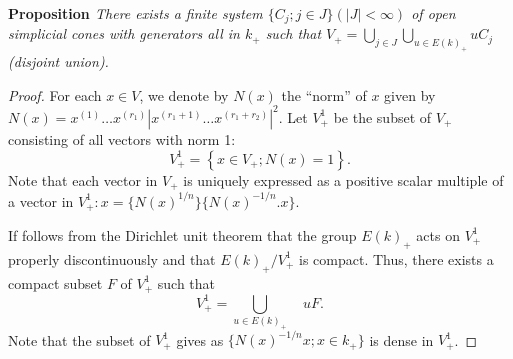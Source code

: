 \medskip
\noindent
{\bfseries Proposition \label{art8-prop2}} 
\textit{There exists a finite system $\{C_j; j \in J\} (|J| < \infty)$ of open simplicial cones with generators all in $k_+$ such that $V_+ = \bigcup\limits_{j \in J} \bigcup\limits_{u \in E (k)_+} uC_j$ (disjoint union).}

\begin{proof}
For each $x \in V$, we denote by $N(x)$ the ``norm'' of $x$ given by $N(x) = x^{(1)} \ldots x^{(r_1)} | x^{(r_1+1)} \ldots x^{(r_1+ r_2)} |^2$. Let $V^1_+$ be the subset of $V_+$ consisting of all vectors with norm 1:
$$
V^1_+ = \left\{x \in V_+ ; N (x) = 1 \right\}.
$$
Note that each vector in $V_+$ is uniquely expressed as a positive scalar multiple of a vector in $V^1_+ : x = \{N (x)^{1/n}\}\{N(x)^{-1/n}. x\}$.

If follows from the Dirichlet unit theorem that the group $E(k)_+$ acts on $V^1_+$ properly discontinuously and that $E(k)_+ / V^1_+$ is compact. Thus, there exists a compact subset $F$ of $V^1_+$ such that 
\begin{equation}
V^1_+ =\bigcup\limits_{u \in E (k)_+} \quad u F.\tag{1}\label{art8-eq1} 
\end{equation}
Note that the subset of $V^1_+$ gives as $\{N (x)^{-1/n} x ; x \in k_+\}$ is dense in $V^1_+$.


\end{proof}
